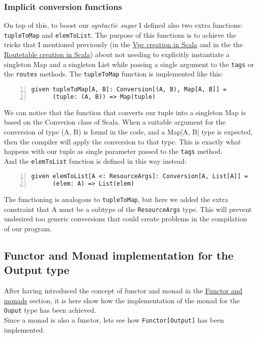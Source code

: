 \subsubsection{Implicit conversion functions}
\label{sssec:implicit-converion-functions}
On top of this, to boost our \textit{syntactic sugar} I defined also two extra functions: \texttt{tupleToMap} and \texttt{elemToList}.
The purpose of this functions is to achieve the tricks that I mentioned previously (in the \hyperref[sssec:vpc-creation-scala]{Vpc creation in Scala} and in the the \hyperref[sssec:routetable-creation-scala]{Routetable creation in Scala}) about not needing to explicitly instantiate a singleton Map and a singleton List while passing a single argument to the \texttt{tags} or the \texttt{routes} methods.
The \texttt{tupleToMap} function is implemented like this:\\
\begin{minipage}{\linewidth}
\begin{lstlisting}[numbers=left, numberstyle=\tiny, numbersep=-5pt, stepnumber=1, linewidth=420pt]
  given tupleToMap[A, B]: Conversion[(A, B), Map[A, B]] =
	  (tuple: (A, B)) => Map(tuple)
\end{lstlisting}
\end{minipage}
We can notice that the function that converts our tuple into a singleton Map is based on the Converion class of Scala.
When a suitable argument for the conversion of type (A, B) is found in the code, and a Map[A, B] type is expected, then the compiler will apply the conversion to that type.
This is exactly what happens with our tuple as single parameter passed to the \texttt{tags} method.\\
And the \texttt{elemToList} function is defined in this way instead:\\
\begin{minipage}{\linewidth}
\begin{lstlisting}[numbers=left, numberstyle=\tiny, numbersep=-5pt, stepnumber=1, linewidth=420pt]
  given elemToList[A <: ResourceArgs]: Conversion[A, List[A]] =
	  (elem: A) => List(elem)
\end{lstlisting}
\end{minipage}
The functioning is analogous to \texttt{tupleToMap}, but here we added the extra constraint that A must be a subtype of the \texttt{ResourceArgs} type.
This will prevent undesired too generic conversions that could create problems in the compilation of our program.

\subsection{Functor and Monad implementation for the Output type}
After having introduced the concept of functor and monad in the \hyperref[sssec:functors-monads]{Functor and monads} section, it is here show how the implementation of the monad for the \texttt{Ouput} type has been achieved.\\
Since a monad is also a functor, lets see how \texttt{Functor[Output]} has been implemented.

